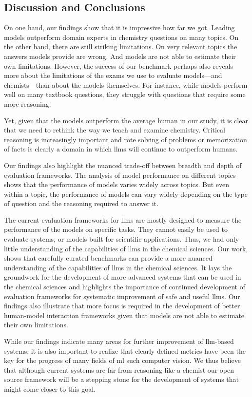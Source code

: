 \documentclass[11pt, oneside]{article}
\begin{document}
\begin{refsection}
\section{Discussion and Conclusions}
On one hand, our findings show that it is impressive how far we got. Leading models outperform domain experts in chemistry questions on many topics. 
On the other hand, there are still striking limitations. On very relevant topics the answers models provide are wrong. And models are not able to estimate their own limitations.
However, the success of our benchmark perhaps also reveals more about the limitations of the exams we use to evaluate models---and chemists---than about the models themselves.
For instance, while models perform well on many textbook questions, they struggle with questions that require some more reasoning.

Yet, given that the models outperform the average human in our study, it is clear that we need to rethink the way we teach and examine chemistry.
Critical reasoning is increasingly important and rote solving of problems or memorization of facts is clearly a domain in which \glspl{llm} will continue to outperform humans.

Our findings also highlight the nuanced trade-off between breadth and depth of evaluation frameworks. 
The analysis of model performance on different topics shows that the performance of models varies widely across topics. 
But even within a topic, the performance of models can vary widely depending on the type of question and the reasoning required to answer it.

The current evaluation frameworks for \glspl{llm} are mostly designed to measure the performance of the models on specific tasks. 
They cannot easily be used to evaluate systems, or models built for scientific applications. 
Thus, we had only little understanding of the capabilities of \glspl{llm} in the chemical sciences.
Our work, shows that carefully curated benchmarks can provide a more nuanced understanding of the capabilities of \glspl{llm} in the chemical sciences.
It lays the groundwork for the development of more advanced systems that can be used in the chemical sciences and highlights the importance of continued development of evaluation frameworks for systematic improvement of safe and useful \glspl{llm}.
Our findings also illustrate that more focus is required in the development of better human-model interaction frameworks given that models are not able to estimate their own limitations.

While our findings indicate many areas for further improvement of \gls{llm}-based systems, it is also important to realize that clearly defined metrics have been the key for the progress of many fields of \gls{ml} such computer vision. 
We thus believe that although current systems are far from reasoning like a chemist our open source \chembench framework will be a stepping stone for the development of systems that might come closer to this goal.


\end{refsection}
\end{document}

